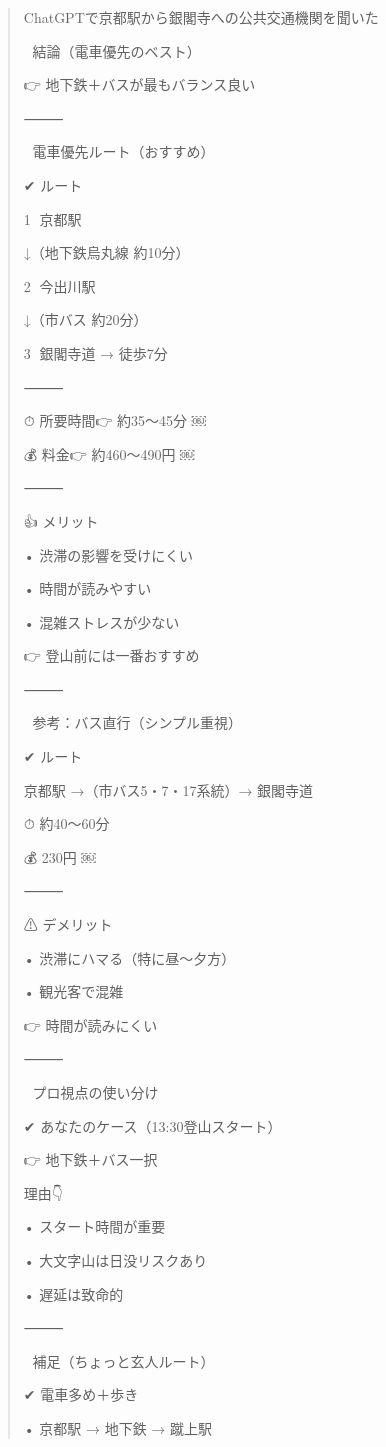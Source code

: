 \begin{quote}
ChatGPTで京都駅から銀閣寺への公共交通機関を聞いた

🎯 結論（電車優先のベスト）

👉 地下鉄＋バスが最もバランス良い

⸻

🚃 電車優先ルート（おすすめ）

✔ ルート

1⃣ 京都駅

↓（地下鉄烏丸線 約10分）

2⃣ 今出川駅

↓（市バス 約20分）

3⃣ 銀閣寺道 → 徒歩7分

⸻

⏱ 所要時間👉 約35〜45分  ￼

💰 料金👉 約460〜490円  ￼

⸻

👍 メリット

• 渋滞の影響を受けにくい

• 時間が読みやすい

• 混雑ストレスが少ない

👉 登山前には一番おすすめ

⸻

🚌 参考：バス直行（シンプル重視）

✔ ルート

京都駅 →（市バス5・7・17系統）→ 銀閣寺道

⏱ 約40〜60分

💰 230円  ￼

⸻

⚠ デメリット

• 渋滞にハマる（特に昼〜夕方）

• 観光客で混雑

👉 時間が読みにくい

⸻

🧠 プロ視点の使い分け

✔ あなたのケース（13:30登山スタート）

👉 地下鉄＋バス一択

理由👇

• スタート時間が重要

• 大文字山は日没リスクあり

• 遅延は致命的

⸻

🚶 補足（ちょっと玄人ルート）

✔ 電車多め＋歩き

• 京都駅 → 地下鉄 → 蹴上駅


\end{quote}
